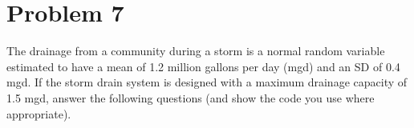\documentclass[12pt,twoside]{article}
\newcommand{\pts}[1]{\marginpar{ \small\hspace{0pt} \textit{[#1]} } }
\newcommand{\?}{\stackrel{?}{=}}
\newcommand{\gr}{\color{green!40!black}}
\begin{document}
  







  

 


\section*{Problem 7  }
The drainage from a community during a storm is a normal random variable
estimated to have a mean of 1.2 million gallons per day (mgd) and an SD of 0.4
mgd. If the storm drain system is designed with a maximum drainage capacity of
1.5 mgd, answer the following questions (and show the code you use where appropriate).
\end{document}
